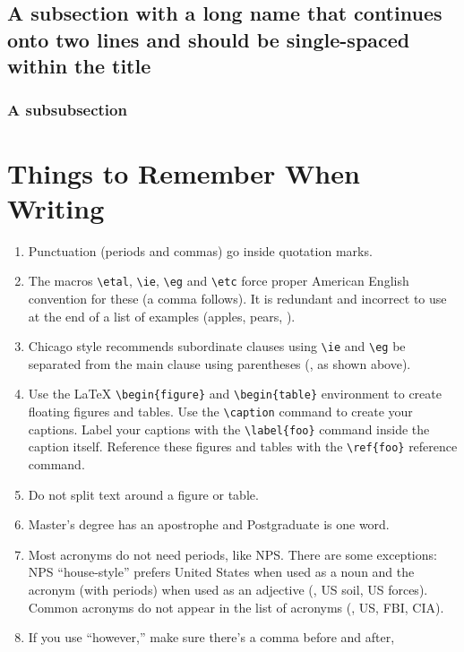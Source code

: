 \subsection{A subsection with a long name that continues onto two lines and should be single-spaced within the title}\label{sec:another}
\lipsum[3]

\subsubsection{A subsubsection}\label{sec:minorstuff}
\lipsum[4]

\section{Things to Remember When Writing}\label{sec:remember}
\begin{enumerate}
\item Punctuation (periods and commas) go inside quotation marks. 
\item The macros \verb+\etal+, \verb+\ie+, \verb+\eg+ and \verb+\etc+ force proper
  American English convention for these (\ie a comma follows).
  It is redundant and incorrect to use \etc at the end of a list of
  examples (\eg apples, pears, \etc).
\item Chicago style recommends subordinate clauses using \verb+\ie+ and \verb+\eg+ be
separated from the main clause using parentheses (\eg, as shown above).
\item Use the \LaTeX{} \verb+\begin{figure}+ and \verb+\begin{table}+ environment to
  create floating figures and tables. Use the \verb+\caption+ command
  to create your captions. Label your captions with the
  \verb+\label{foo}+ command inside the caption itself. Reference
  these figures and tables with the \verb+\ref{foo}+ reference command.
\item Do not split text around a figure or table. 
\item Master's degree has an apostrophe and Postgraduate is one word. 
\item Most acronyms do not need periods, like \ac{NPS}. There are some exceptions:
\ac{NPS} ``house-style'' prefers United States when used as a noun and the acronym (with periods) when used as an adjective (\eg, \ac{US} soil, \ac{US} forces).
Common acronyms do not appear in the list of acronyms (\eg, \ac{US}, \ac{FBI}, \ac{CIA}).
\item If you use ``however,'' make sure there's a comma before and after,

\end{enumerate}
